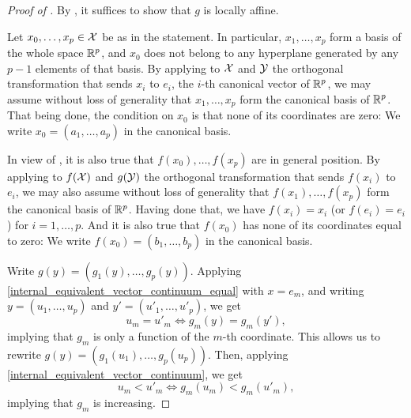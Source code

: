 \documentclass[twoside, 11pt]{article}
\begin{document}
\begin{proof}[Proof of ]
By , it suffices to show that $g$ is locally affine.

Let $x_0, \dots, x_p \in \mathcal{X}$ be as in the statement. In particular, $x_1, \dots, x_p$ form a basis of the whole space $\mathbb{R}^p$, and $x_0$ does not belong to any hyperplane generated by any $p-1$ elements of that basis. 
By applying to $\mathcal{X}$ and $\mathcal{Y}$ the orthogonal transformation that sends $x_i$ to $e_i$, the $i$-th canonical vector of $\mathbb{R}^p$, we may assume without loss of generality that $x_1, \dots, x_p$ form the canonical basis of $\mathbb{R}^p$. That being done, the condition on $x_0$ is that none of its coordinates are zero: We write $x_0 = (a_1, \dots, a_p)$ in the canonical basis. 

In view of , it is also true that $f(x_0), \dots, f(x_p)$ are in general position. By applying to $f(\mathcal{X})$ and $g(\mathcal{Y})$ the orthogonal transformation that sends $f(x_i)$ to $e_i$, we may also assume without loss of generality that $f(x_1), \dots, f(x_p)$ form the canonical basis of $\mathbb{R}^p$. 
Having done that, we have $f(x_i) = x_i$ (or $f(e_i) = e_i$) for $i = 1, \dots, p$.
And it is also true that $f(x_0)$ has none of its coordinates equal to zero: We write $f(x_0) = (b_1, \dots, b_p)$ in the canonical basis.  

Write $g(y) = (g_1(y), \dots, g_p(y))$.
Applying \eqref{internal_equivalent_vector_continuum_equal} with $x = e_m$, and writing $y = (u_{1}, \dots, u_{p})$ and $y' = (u'_{1}, \dots, u'_{p})$, we get
\begin{equation}
u_{m} = u'_{m} \iff g_m(y) = g_m(y'),
\end{equation}
implying that $g_m$ is only a function of the $m$-th coordinate. This allows us to rewrite $g(y) = (g_1(u_{1}), \dots, g_p(u_{p}))$. Then, applying \eqref{internal_equivalent_vector_continuum}, we get
\begin{equation}
u_{m} < u'_{m} \iff g_m(u_{m}) < g_m(u'_{m}),
\end{equation}
implying that $g_m$ is increasing.


\end{proof}
\end{document}
